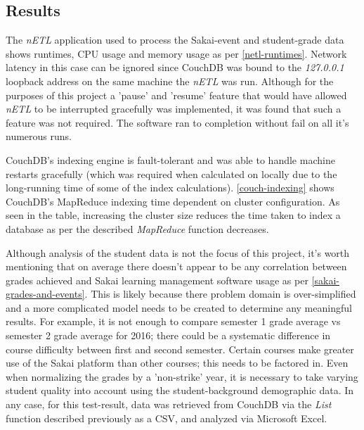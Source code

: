 \subsection{Results}
The \textit{nETL} application used to process the Sakai-event and student-grade data shows runtimes, CPU usage and memory usage as per \ref{netl-runtimes}. Network latency in this case can be ignored since CouchDB was bound to the \textit{127.0.0.1} loopback address on the same machine the \textit{nETL} was run. Although for the purposes of this project a 'pause' and 'resume' feature that would have allowed \textit{nETL} to be interrupted gracefully was implemented, it was found that such a feature was not required. The software ran to completion without fail on all it's numerous runs.

CouchDB's indexing engine is fault-tolerant and was able to handle machine restarts gracefully (which was required when calculated on locally due to the long-running time of some of the index calculations). \ref{couch-indexing} shows CouchDB's MapReduce indexing time dependent on cluster configuration. As seen in the table, increasing the cluster size reduces the time taken to index a database as per the described \textit{MapReduce} function decreases.

Although analysis of the student data is not the focus of this project, it's worth mentioning that on average there doesn't appear to be any correlation between grades achieved and Sakai learning management software usage as per \ref{sakai-grades-and-events}. This is likely because there problem domain is over-simplified and a more complicated model needs to be created to determine any meaningful results. For example, it is not enough to compare semester 1 grade average vs semester 2 grade average for 2016; there could be a systematic difference in course difficulty between first and second semester. Certain courses make greater use of the Sakai platform than other courses; this needs to be factored in. Even when normalizing the grades by a 'non-strike' year, it is necessary to take varying student quality into account using the student-background demographic data. In any case, for this test-result, data was retrieved from CouchDB via the \textit{List} function described previously as a CSV, and analyzed via Microsoft Excel.

